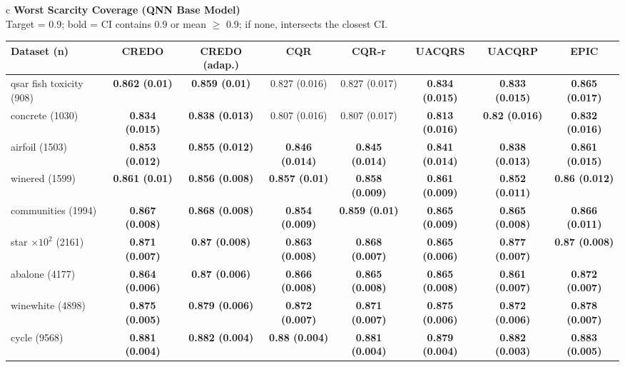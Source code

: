 \documentclass[border=6pt]{standalone}
\begin{document}
\begin{adjustbox}{max width=\linewidth}
\begin{tabular}{c}
{\small\textbf{Worst Scarcity Coverage (QNN Base Model)}}\\[-1pt]
{\scriptsize Target = 0.9; bold = CI contains 0.9 or mean $\geq$ 0.9; if none, intersects the closest CI.}\\[2pt]
\scriptsize\begin{tabular}{lccccccc}
\hline
Dataset (n) & \textbf{CREDO} & \textbf{CREDO (adap.)} & \textbf{CQR} & \textbf{CQR-r} & \textbf{UACQRS} & \textbf{UACQRP} & \textbf{EPIC}\\ \hline
qsar fish toxicity (908) & \textbf{0.862 (0.01)} & \textbf{0.859 (0.01)} & 0.827 (0.016) & 0.827 (0.017) & \textbf{0.834 (0.015)} & \textbf{0.833 (0.015)} & \textbf{0.865 (0.017)}\\
concrete (1030) & \textbf{0.834 (0.015)} & \textbf{0.838 (0.013)} & 0.807 (0.016) & 0.807 (0.017) & \textbf{0.813 (0.016)} & \textbf{0.82 (0.016)} & \textbf{0.832 (0.016)}\\
airfoil (1503) & \textbf{0.853 (0.012)} & \textbf{0.855 (0.012)} & \textbf{0.846 (0.014)} & \textbf{0.845 (0.014)} & \textbf{0.841 (0.014)} & \textbf{0.838 (0.013)} & \textbf{0.861 (0.015)}\\
winered (1599) & \textbf{0.861 (0.01)} & \textbf{0.856 (0.008)} & \textbf{0.857 (0.01)} & \textbf{0.858 (0.009)} & \textbf{0.861 (0.009)} & \textbf{0.852 (0.011)} & \textbf{0.86 (0.012)}\\
communities (1994) & \textbf{0.867 (0.008)} & \textbf{0.868 (0.008)} & \textbf{0.854 (0.009)} & \textbf{0.859 (0.01)} & \textbf{0.865 (0.009)} & \textbf{0.865 (0.008)} & \textbf{0.866 (0.011)}\\
star $\times 10^2$ (2161) & \textbf{0.871 (0.007)} & \textbf{0.87 (0.008)} & \textbf{0.863 (0.008)} & \textbf{0.868 (0.007)} & \textbf{0.865 (0.006)} & \textbf{0.877 (0.007)} & \textbf{0.87 (0.008)}\\
abalone (4177) & \textbf{0.864 (0.006)} & \textbf{0.87 (0.006)} & \textbf{0.866 (0.008)} & \textbf{0.865 (0.008)} & \textbf{0.865 (0.008)} & \textbf{0.861 (0.007)} & \textbf{0.872 (0.007)}\\
winewhite (4898) & \textbf{0.875 (0.005)} & \textbf{0.879 (0.006)} & \textbf{0.872 (0.007)} & \textbf{0.871 (0.007)} & \textbf{0.875 (0.006)} & \textbf{0.872 (0.006)} & \textbf{0.878 (0.007)}\\
cycle (9568) & \textbf{0.881 (0.004)} & \textbf{0.882 (0.004)} & \textbf{0.88 (0.004)} & \textbf{0.881 (0.004)} & \textbf{0.879 (0.004)} & \textbf{0.882 (0.003)} & \textbf{0.883 (0.005)}\\

\end{tabular}
\end{tabular}
\end{adjustbox}
\end{document}
